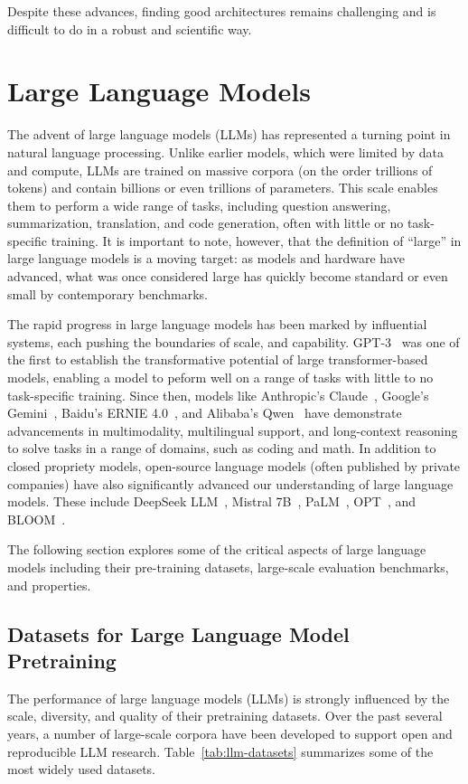 Despite these advances, finding good architectures remains challenging and is difficult to do in a robust and scientific way.

\section{Large Language Models}

The advent of large language models (LLMs) has represented a turning point in natural language processing. Unlike earlier models, which were limited by data and compute, LLMs are trained on massive corpora (on the order trillions of tokens) and contain billions or even trillions of parameters. This scale enables them to perform a wide range of tasks, including question answering, summarization, translation, and code generation, often with little or no task-specific training. It is important to note, however, that the definition of ``large'' in large language models is a moving target: as models and hardware have advanced, what was once considered large has quickly become standard or even small by contemporary benchmarks.

The rapid progress in large language models has been marked by influential systems, each pushing the boundaries of scale, and capability. GPT-3~\citep{brown2020gpt3} was one of the first to establish the transformative potential of large transformer-based models, enabling a model to peform well on a range of tasks with little to no task-specific training. Since then, models like Anthropic's Claude~\citep{anthropic2024claude3,anthropic2024claude35,anthropic2025claude37}, Google's Gemini~\citep{deepmind2023gemini}, Baidu's ERNIE 4.0~\citep{baidu2023ernie4}, and Alibaba's Qwen~\citep{alibaba2023qwen} have demonstrate advancements in multimodality, multilingual support, and long-context reasoning to solve tasks in a range of domains, such as coding and math. In addition to closed propriety models, open-source language models (often published by private companies) have also significantly advanced our understanding of large language models. These include DeepSeek LLM~\citep{deepseek2024llm}, Mistral 7B~\citep{jiang2023mistral}, PaLM~\citep{chowdhery2023palm}, OPT~\citep{zhang2022opt}, and BLOOM~\citep{le2023bloom}. 

The following section explores some of the critical aspects of large language models including their pre-training datasets, large-scale evaluation benchmarks, and properties.

\subsection{Datasets for Large Language Model Pretraining}
The performance of large language models (LLMs) is strongly influenced by the scale, diversity, and quality of their pretraining datasets. Over the past several years, a number of large-scale corpora have been developed to support open and reproducible LLM research. Table~\ref{tab:llm-datasets} summarizes some of the most widely used datasets.

